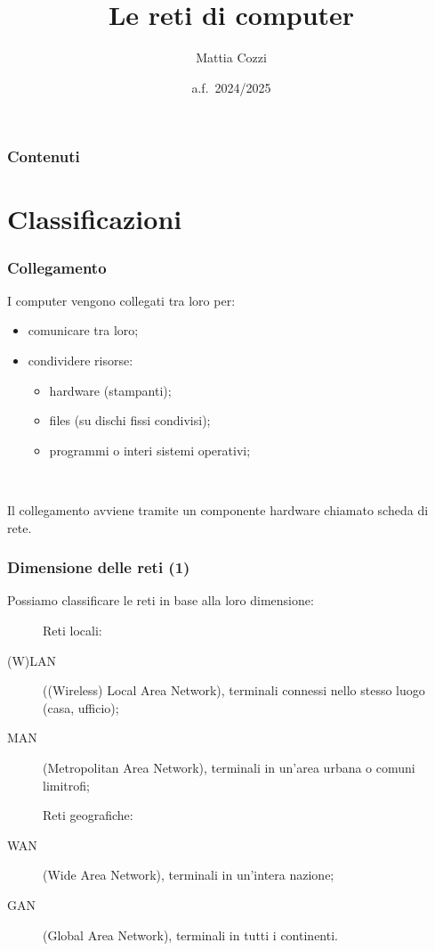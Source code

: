 \documentclass[]{beamer}
\title{Le reti di computer}
\author{Mattia Cozzi}
\date{a.f.~2024/2025}
\begin{document}
\begin{frame}
  \titlepage
\end{frame}


\begin{frame}
\frametitle{Contenuti}
\tableofcontents
\end{frame}



\section{Classificazioni}


\begin{frame}
\frametitle{Collegamento}
I computer vengono collegati tra loro per:
\begin{itemize}
  \item comunicare tra loro;\pause
  \item condividere risorse:\pause
  \begin{itemize}
    \item hardware (stampanti);\pause
    \item files (su dischi fissi condivisi);\pause
    \item programmi o interi sistemi operativi;\pause
  \end{itemize}
\end{itemize}

~

Il collegamento avviene tramite un componente hardware chiamato \alert{scheda di rete}.
\end{frame}


\begin{frame}
\frametitle{Dimensione delle reti (1)}
Possiamo classificare le reti in base alla loro \alert<1>{dimensione}:\pause
\begin{description}
  \item[] Reti locali:
  \item[(W)LAN] ((Wireless) Local Area Network), terminali connessi nello stesso luogo (casa, ufficio);\pause
  \item[MAN] (Metropolitan Area Network), terminali in un'area urbana o comuni limitrofi;\pause
  \item[] Reti geografiche:
  \item[WAN] (Wide Area Network), terminali in un'intera nazione;\pause
  \item[GAN] (Global Area Network), terminali in tutti i continenti.
\end{description}
\end{frame}
\end{document}
